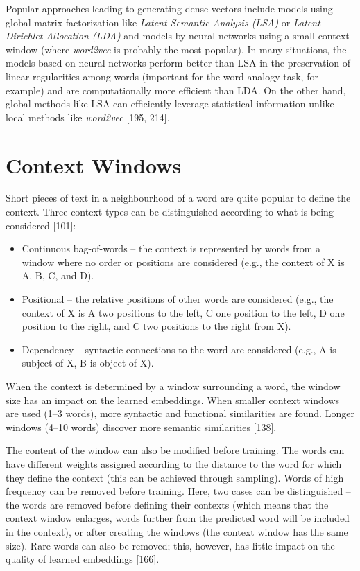 \documentclass[11pt,openany,executivepaper]{book}
\begin{document}
Popular approaches leading to generating dense vectors include models using global matrix factorization like \textit{Latent Semantic Analysis (LSA)} or \textit{Latent Dirichlet Allocation (LDA)} and models by neural networks using a small context window (where \textit{word2vec} is probably the most popular). In many situations, the models based on neural networks perform better than LSA in the preservation of linear regularities among words (important for the word analogy task, for example) and are computationally more efficient than LDA. On the other hand, global methods like LSA can efficiently leverage statistical information unlike local methods like \textit{word2vec} [195, 214].

\section{Context Windows}
Short pieces of text in a neighbourhood of a word are quite popular to define the context. Three context types can be distinguished according to what is being considered [101]:

\begin{itemize}
    \item Continuous bag-of-words -- the context is represented by words from a window where no order or positions are considered (e.g., the context of X is A, B, C, and D).
    \item Positional -- the relative positions of other words are considered (e.g., the context of X is A two positions to the left, C one position to the left, D one position to the right, and C two positions to the right from X).
    \item Dependency -- syntactic connections to the word are considered (e.g., A is subject of X, B is object of X).
\end{itemize}

When the context is determined by a window surrounding a word, the window size has an impact on the learned embeddings. When smaller context windows are used (1--3 words), more syntactic and functional similarities are found. Longer windows (4--10 words) discover more semantic similarities [138].

The content of the window can also be modified before training. The words can have different weights assigned according to the distance to the word for which they define the context (this can be achieved through sampling). Words of high frequency can be removed before training. Here, two cases can be distinguished -- the words are removed before defining their contexts (which means that the context window enlarges, words further from the predicted word will be included in the context), or after creating the windows (the context window has the same size). Rare words can also be removed; this, however, has little impact on the quality of learned embeddings [166].
\end{document}
